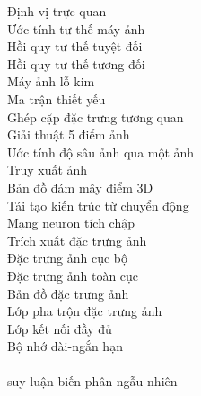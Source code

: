 \begin{keyword}
  		    {Định vị trực quan} 		    \\
  		{Ước tính tư thế máy ảnh} 		\\
  		{Hồi quy tư thế tuyệt đối} 		\\
  		{Hồi quy tư thế tương đối} 		\\
  		        {Máy ảnh lỗ kim} 	        	\\
  		        {Ma trận thiết yếu} 		    \\
  		        {Ghép cặp đặc trưng tương quan} 	\\
  		        {Giải thuật 5 điểm ảnh} 		\\
  	{Ước tính độ sâu ảnh qua một ảnh} 		\\
  		        {Truy xuất ảnh} 	        	\\
  		        {Bản đồ đám mây điểm 3D} 		\\
  		    {Tái tạo kiến trúc từ chuyển động} 	\\
  		{Mạng neuron tích chập} 		\\
  	        {Trích xuất đặc trưng ảnh} 		\\
  		        {Đặc trưng ảnh cục bộ} 	        \\
               {Đặc trưng ảnh toàn cục}        \\
                     {Bản đồ đặc trưng ảnh}          \\
                   {Lớp pha trộn đặc trưng ảnh}    \\
           {Lớp kết nối đầy đủ}            \\
          {Bộ nhớ dài-ngắn hạn}           \\
   \\
    {suy luận biến phân ngẫu nhiên} \\

\end{keyword}
